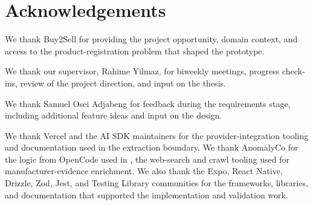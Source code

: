 \chapter*{Acknowledgements}

We thank Buy2Sell for providing the project opportunity, domain context, and access to the product-registration problem that shaped the prototype.

We thank our supervisor, Rahime Yilmaz, for biweekly meetings, progress check-ins, review of the project direction, and input on the thesis.

We thank Samuel Osei Adjabeng for feedback during the requirements stage, including additional feature ideas and input on the design.

We thank Vercel and the AI SDK maintainers for the provider-integration tooling and documentation used in the extraction boundary. We thank AnomalyCo for the logic from OpenCode used in , the web-search and crawl tooling used for manufacturer-evidence enrichment. We also thank the Expo, React Native, Drizzle, Zod, Jest, and Testing Library communities for the frameworks, libraries, and documentation that supported the implementation and validation work.
